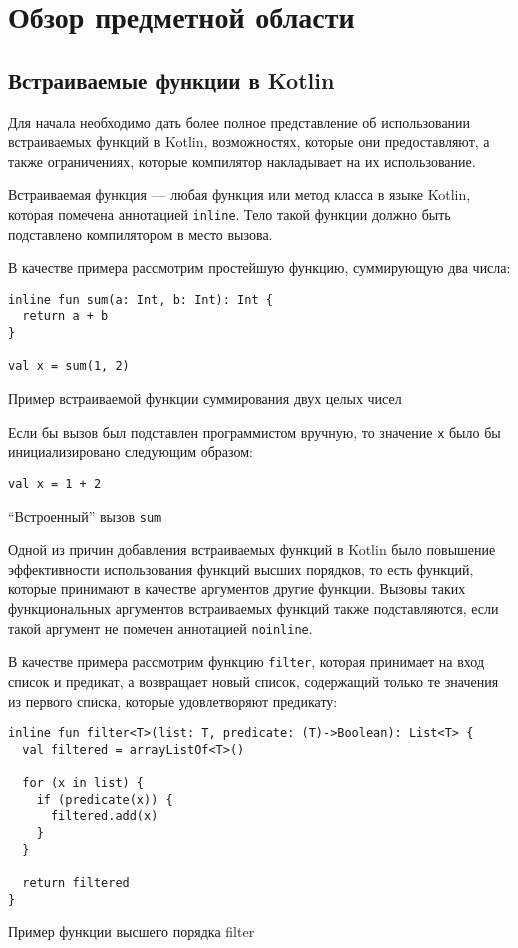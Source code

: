 \section{Обзор предметной области}

\subsection{Встраиваемые функции в Kotlin}

Для начала необходимо дать более полное представление
об использовании встраиваемых функций в Kotlin,
возможностях, которые они предоставляют, а также
ограничениях, которые компилятор накладывает на их использование.

Встраиваемая функция --- любая функция или метод класса в языке Kotlin,
которая помечена аннотацией \texttt{inline}.
Тело такой функции должно быть подставлено компилятором в место вызова.

В качестве примера рассмотрим простейшую функцию, суммирующую два числа:
\begin{listing}[H]
\begin{verbatim}
inline fun sum(a: Int, b: Int): Int {
  return a + b
}

val x = sum(1, 2)
\end{verbatim}
\caption{Пример встраиваемой функции суммирования двух целых чисел}
\end{listing}

Если бы вызов был подставлен программистом вручную, то
значение \texttt{x} было бы инициализировано следующим образом:
\begin{listing}[H]
\begin{verbatim}
val x = 1 + 2
\end{verbatim}
\caption{``Встроенный'' вызов \texttt{sum}}
\end{listing}

Одной из причин добавления встраиваемых функций в Kotlin было
повышение эффективности использования функций высших порядков,
то есть функций, которые принимают в качестве аргументов
другие функции. Вызовы таких функциональных аргументов
встраиваемых функций также подставляются, если такой
аргумент не помечен аннотацией \texttt{noinline}.

В качестве примера рассмотрим функцию \texttt{filter},
которая принимает на вход список и предикат, а возвращает
новый список, содержащий только те значения из
первого списка, которые удовлетворяют предикату:
\begin{listing}[H]
\begin{verbatim}
inline fun filter<T>(list: T, predicate: (T)->Boolean): List<T> {
  val filtered = arrayListOf<T>()

  for (x in list) {
    if (predicate(x)) {
      filtered.add(x)
    }
  }

  return filtered
}
\end{verbatim}
\caption{Пример функции высшего порядка filter}
\label{lst:filter-example}
\end{listing}


